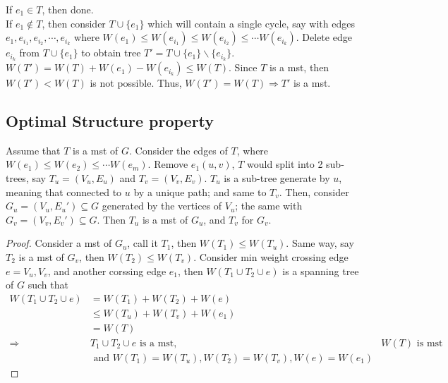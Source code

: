 \documentclass[a4paper]{article}
\begin{document}
If $e_1\in T$, then done. \\
If $e_1\notin T$, then consider $T\cup \{e_1\}$ which will contain a single cycle, say with edges $e_1,e_{i_1},e_{i_2},\cdots, e_{i_k}$ where $W(e_1)\leq W(e_{i_1})\leq W(e_{i_2})\leq \cdots W(e_{i_k})$. Delete edge $e_{i_k}$ from $T\cup \{e_1\}$ to obtain tree $T'=T\cup \{e_1\}\backslash \{e_{i_k}\}$. $W(T')=W(T)+W(e_1)-W(e_{i_k})\leq W(T)$.
Since $T$ is a mst, then $W(T')< W(T)$ is not possible. Thus, $W(T')=W(T)\Rightarrow T'$ is a mst.
\subsection*{Optimal Structure property}
Assume that $T$ is a mst of $G$. Consider the edges of $T$, where $W(e_1)\leq W(e_2)\leq \cdots W(e_m)$. Remove $e_1(u,v)$, $T$ would split into 2 sub-trees, say $T_u=(V_u,E_u)$ and $T_v=(V_v,E_v)$. $T_u$ is a sub-tree generate by $u$, meaning that connected to $u$ by a unique path; and same to $T_v$. Then, consider $G_u=(V_u,{E_u}')\subseteq G$ generated by the vertices of $V_u$; the same with $G_v=(V_v,{E_v}')\subseteq G$. Then $T_u$ is a mst of $G_u$, and $T_v$ for $G_v$.
\begin{proof}
Consider a mst of $G_u$, call it $T_1$, then $W(T_1)\leq W(T_u)$. Same way, say $T_2$ is a mst of $G_v$, then $W(T_2)\leq W(T_v)$. Consider min weight crossing edge $e=V_u,V_v$, and another corssing edge $e_1$, then $W(T_1\cup T_2\cup e)$ is a spanning tree of $G$ such that
\begin{align*}
    W(T_1\cup T_2\cup e)&=W(T_1)+W(T_2)+W(e)\\
    &\leq W(T_u)+W(T_v)+W(e_1)\\
    &=W(T)\\
    \Rightarrow&T_1\cup T_2\cup e \text{ is a mst,}& W(T)\text{ is mst}\\
    &\text{ and }W(T_1)=W(T_u),W(T_2)=W(T_v),W(e)=W(e_1)
\end{align*}
\end{proof}
\end{document}
